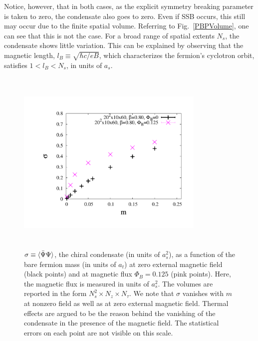 \documentclass[aps,prd,twocolumn,showpacs,superscriptaddress,groupedaddress]{revtex4}  %
\begin{document}
Notice, however, that in both cases, as the explicit symmetry breaking parameter is taken to zero, the condensate also goes to zero. Even if SSB occurs, this still may occur due to the finite spatial volume. Referring to Fig.~\ref{PBPVolume}, one can see that this is not the
case. For a broad range of spatial extents $N_s$, the condensate shows little variation. This can be explained by observing that the magnetic length, $l_B \equiv \sqrt{\hbar c/eB}$, which characterizes the fermion's cyclotron orbit, satisfies $1 < l_B < N_s$, in units of $a_s$. 

\begin{figure}
\vspace{-1.2cm}
\includegraphics[height=9cm,width=9cm]{pbp_vs_m_compare_graphene_paper_new.pdf} 
\vspace{-1.25cm}
\caption{$\sigma \equiv {\langle {\bar \Psi}\Psi \rangle}$, the chiral condensate (in units of $a^2_s$), as a function of the bare fermion mass (in units of $a_t$) at zero external magnetic field (black points) and at magnetic flux $\Phi_B=0.125$ (pink points). Here, the magnetic flux is measured in units of $a^2_s$. The volumes are reported in the form $N^2_s \times N_z \times N_{\tau}$.  We note that $\sigma$ vanishes with $m$ at nonzero field as well as at zero external magnetic field. Thermal effects are argued to be the reason behind the vanishing of the condensate in the presence of the magnetic field. The statistical errors on each point are not visible on this scale.}
\label{PBPComparison}
\end{figure}
\end{document}
